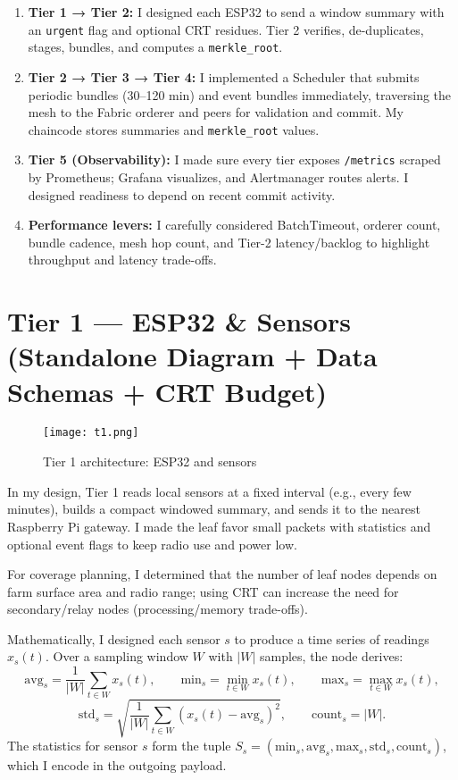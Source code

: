 \documentclass[12pt]{article}
\begin{document}
\begin{enumerate}
\item \textbf{Tier 1 → Tier 2:} I designed each ESP32 to send a window summary with an \texttt{urgent} flag and optional CRT residues. Tier 2 verifies, de-duplicates, stages, bundles, and computes a \texttt{merkle\_root}.
\item \textbf{Tier 2 → Tier 3 → Tier 4:} I implemented a Scheduler that submits periodic bundles (30–120 min) and event bundles immediately, traversing the mesh to the Fabric orderer and peers for validation and commit. My chaincode stores summaries and \texttt{merkle\_root} values.
\item \textbf{Tier 5 (Observability):} I made sure every tier exposes \texttt{/metrics} scraped by Prometheus; Grafana visualizes, and Alertmanager routes alerts. I designed readiness to depend on recent commit activity.
\item \textbf{Performance levers:} I carefully considered BatchTimeout, orderer count, bundle cadence, mesh hop count, and Tier-2 latency/backlog to highlight throughput and latency trade-offs.
\end{enumerate}

\section{Tier 1 — ESP32 \& Sensors (Standalone Diagram + Data Schemas + CRT Budget)}

\begin{figure}[H]
\centering
\texttt{[image: t1.png]}
\caption{Tier 1 architecture: ESP32 and sensors}
\end{figure}
\vspace{-0.5cm} %

In my design, Tier 1 reads local sensors at a fixed interval (e.g., every few minutes), builds a compact windowed summary, and sends it to the nearest Raspberry Pi gateway. I made the leaf favor small packets with statistics and optional event flags to keep radio use and power low.

For coverage planning, I determined that the number of leaf nodes depends on farm surface area and radio range; using CRT can increase the need for secondary/relay nodes (processing/memory trade-offs).

Mathematically, I designed each sensor \(s\) to produce a time series of readings \(x_s(t)\). Over a sampling window \(W\) with \(|W|\) samples, the node derives:
\[
\text{avg}_s = \frac{1}{|W|} \sum_{t\in W} x_s(t),\qquad
\text{min}_s = \min_{t\in W} x_s(t),\qquad
\text{max}_s = \max_{t\in W} x_s(t),
\]
\[
\text{std}_s = \sqrt{\frac{1}{|W|}\sum_{t\in W} (x_s(t)-\text{avg}_s)^2},\qquad
\text{count}_s = |W|.
\]
The statistics for sensor \(s\) form the tuple \(S_s=(\text{min}_s,\text{avg}_s,\text{max}_s,\text{std}_s,\text{count}_s)\), which I encode in the outgoing payload.
\end{document}
